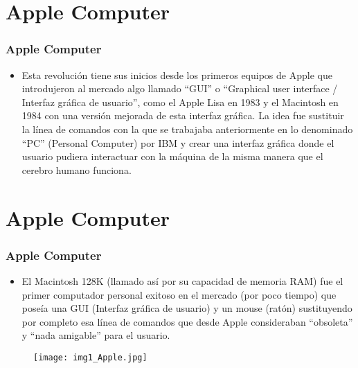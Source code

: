 \documentclass[11pt]{beamer}
\begin{document}
\section{Apple Computer}
\begin{frame}
\frametitle{Apple Computer}

\begin{itemize}
    \item Esta revolución tiene sus inicios desde los primeros equipos de Apple que introdujeron al mercado algo llamado “GUI” o “Graphical user interface / Interfaz gráfica de usuario”, como el Apple Lisa en 1983 y el Macintosh en 1984 con una versión mejorada de esta interfaz gráfica. La idea fue sustituir la línea de comandos con la que se trabajaba anteriormente en lo denominado “PC” (Personal Computer) por IBM y crear una interfaz gráfica donde el usuario pudiera interactuar con la máquina de la misma manera que el cerebro humano funciona.
    
\end{itemize}
\end{frame}

\section{Apple Computer}
\begin{frame}
\frametitle{Apple Computer}
\begin{itemize}
    \item El Macintosh 128K (llamado así por su capacidad de memoria RAM) fue el primer computador personal exitoso en el mercado (por poco tiempo) que poseía una GUI (Interfaz gráfica de usuario) y un mouse (ratón) sustituyendo por completo esa línea de comandos que desde Apple consideraban “obsoleta” y “nada amigable” para el usuario.
\end{itemize}
\begin{figure}
    \centering
    \texttt{[image: img1\_Apple.jpg]}
    \label{fig:my_label}
\end{figure}
\end{frame}
\end{document}
